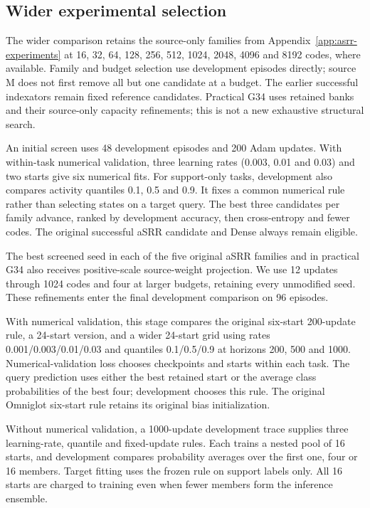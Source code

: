 \subsection{Wider experimental selection}
\label{app:asrr-tuning-details}

The wider comparison retains the source-only families from
Appendix~\ref{app:asrr-experiments} at 16, 32, 64, 128, 256, 512,
1024, 2048, 4096 and 8192 codes, where available. Family and budget
selection use development episodes directly; source M does not first
remove all but one candidate at a budget. The earlier successful
indexators remain fixed reference candidates. Practical G34 uses
retained banks and their source-only capacity refinements; this is not
a new exhaustive structural search.

An initial screen uses 48 development episodes and 200 Adam updates.
With within-task numerical validation, three learning rates
(0.003, 0.01 and 0.03) and two starts give six numerical fits. For
support-only tasks, development also compares activity quantiles
0.1, 0.5 and 0.9. It fixes a common numerical rule rather than selecting
states on a target query. The best three candidates per family advance,
ranked by development accuracy, then cross-entropy and fewer codes.
The original successful aSRR candidate and Dense always remain eligible.

The best screened seed in each of the five original aSRR families and
in practical G34 also receives positive-scale source-weight projection.
We use 12 updates through 1024 codes and four at larger budgets, retaining
every unmodified seed. These refinements enter the final development
comparison on 96 episodes.

With numerical validation, this stage compares the original six-start
200-update rule, a 24-start version, and a wider 24-start grid using
rates 0.001/0.003/0.01/0.03 and quantiles 0.1/0.5/0.9 at horizons
200, 500 and 1000. Numerical-validation loss chooses checkpoints and
starts within each task. The query prediction uses either the best
retained start or the average class probabilities of the best four;
development chooses this rule. The original Omniglot six-start rule
retains its original bias initialization.

Without numerical validation, a 1000-update development trace supplies
three learning-rate, quantile and fixed-update rules. Each trains a
nested pool of 16 starts, and development compares probability averages
over the first one, four or 16 members. Target fitting uses the frozen
rule on support labels only. All 16 starts are charged to training even
when fewer members form the inference ensemble.

